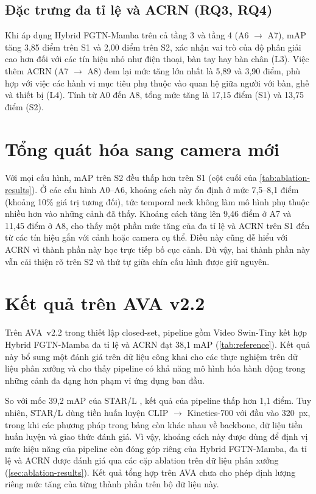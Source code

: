 \subsection{Đặc trưng đa tỉ lệ và ACRN (RQ3, RQ4)}

Khi áp dụng Hybrid FGTN-Mamba trên cả tầng 3 và tầng 4 (A6 $\rightarrow$ A7), mAP tăng 3,85 điểm trên S1 và 2,00 điểm trên S2, xác nhận vai trò của độ phân giải cao hơn đối với các tín hiệu nhỏ như điện thoại, bàn tay hay bàn chân (L3). Việc thêm ACRN (A7 $\rightarrow$ A8) đem lại mức tăng lớn nhất là 5,89 và 3,90 điểm, phù hợp với việc các hành vi mục tiêu phụ thuộc vào quan hệ giữa người với bàn, ghế và thiết bị (L4). Tính từ A0 đến A8, tổng mức tăng là 17,15 điểm (S1) và 13,75 điểm (S2).

\section{Tổng quát hóa sang camera mới}
\label{sec:cross-camera}

Với mọi cấu hình, mAP trên S2 đều thấp hơn trên S1 (cột cuối của \cref{tab:ablation-results}). Ở các cấu hình A0--A6, khoảng cách này ổn định ở mức 7,5--8,1 điểm (khoảng 10\% giá trị tương đối), tức temporal neck không làm mô hình phụ thuộc nhiều hơn vào những cảnh đã thấy. Khoảng cách tăng lên 9,46 điểm ở A7 và 11,45 điểm ở A8, cho thấy một phần mức tăng của đa tỉ lệ và ACRN trên S1 đến từ các tín hiệu gắn với cảnh hoặc camera cụ thể. Điều này cũng dễ hiểu với ACRN vì thành phần này học trực tiếp bố cục cảnh. Dù vậy, hai thành phần này vẫn cải thiện rõ trên S2 và thứ tự giữa chín cấu hình được giữ nguyên.

\section{Kết quả trên AVA v2.2}
\label{sec:ava-results}

\label{sec:ava-record}

Trên AVA~v2.2 trong thiết lập closed-set, pipeline gồm Video Swin-Tiny kết hợp Hybrid FGTN-Mamba đa tỉ lệ và ACRN đạt 38,1 mAP (\cref{tab:reference}). Kết quả này bổ sung một đánh giá trên dữ liệu công khai cho các thực nghiệm trên dữ liệu phân xưởng và cho thấy pipeline có khả năng mô hình hóa hành động trong những cảnh đa dạng hơn phạm vi ứng dụng ban đầu.

So với mốc 39,2 mAP của STAR/L \cite{gritsenko2024star}, kết quả của pipeline thấp hơn 1,1 điểm. Tuy nhiên, STAR/L dùng tiền huấn luyện CLIP $\rightarrow$ Kinetics-700 với đầu vào 320~px, trong khi các phương pháp trong bảng còn khác nhau về backbone, dữ liệu tiền huấn luyện và giao thức đánh giá. Vì vậy, khoảng cách này được dùng để định vị mức hiệu năng của pipeline còn đóng góp riêng của Hybrid FGTN-Mamba, đa tỉ lệ và ACRN được đánh giá qua các cặp ablation trên dữ liệu phân xưởng (\cref{sec:ablation-results}). Kết quả tổng hợp trên AVA chưa cho phép định lượng riêng mức tăng của từng thành phần trên bộ dữ liệu này.

